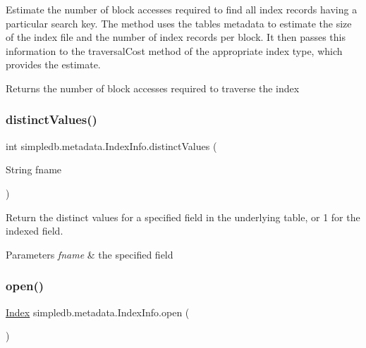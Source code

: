 Estimate the number of block accesses required to find all index records having a particular search key. The method uses the table\textquotesingle{}s metadata to estimate the size of the index file and the number of index records per block. It then passes this information to the traversal\+Cost method of the appropriate index type, which provides the estimate. \begin{DoxyReturn}{Returns}
the number of block accesses required to traverse the index 
\end{DoxyReturn}
\mbox{\label{classsimpledb_1_1metadata_1_1IndexInfo_a1fa2fc27f1a58d44dff16d1689cf73e9}} 
\subsubsection{\texorpdfstring{distinct\+Values()}{distinctValues()}}
{\footnotesize\ttfamily int simpledb.\+metadata.\+Index\+Info.\+distinct\+Values (\begin{DoxyParamCaption}\item[{String}]{fname }\end{DoxyParamCaption})\hspace{0.3cm}{\ttfamily [inline]}}

Return the distinct values for a specified field in the underlying table, or 1 for the indexed field. 
\begin{DoxyParams}{Parameters}
{\em fname} & the specified field \\
\hline
\end{DoxyParams}
\mbox{\label{classsimpledb_1_1metadata_1_1IndexInfo_a09f79392e6b84590a29d0d802e958c72}} 
\subsubsection{\texorpdfstring{open()}{open()}}
{\footnotesize\ttfamily \hyperlink{interfacesimpledb_1_1index_1_1Index}{Index} simpledb.\+metadata.\+Index\+Info.\+open (\begin{DoxyParamCaption}{ }\end{DoxyParamCaption})\hspace{0.3cm}{\ttfamily [inline]}}

